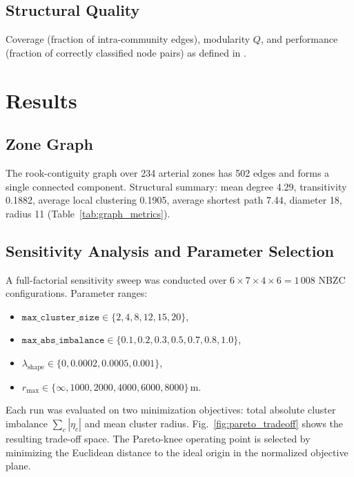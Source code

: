 \documentclass[conference]{IEEEtran}
\begin{document}
\subsection{Structural Quality}
Coverage (fraction of intra-community edges), modularity $Q$, and
performance (fraction of correctly classified node pairs) as defined in
\cite{nx_comm}.

\section{Results}

\subsection{Zone Graph}
The rook-contiguity graph over 234 arterial zones has 502 edges and
forms a single connected component.
Structural summary: mean degree 4.29, transitivity 0.1882, average
local clustering 0.1905, average shortest path 7.44, diameter 18,
radius 11 (Table~\ref{tab:graph_metrics}).

\subsection{Sensitivity Analysis and Parameter Selection}

A full-factorial sensitivity sweep was conducted over
$6\times7\times4\times6=1\,008$ NBZC configurations.
Parameter ranges:
\begin{itemize}
  \item $\texttt{max\_cluster\_size} \in \{2,4,8,12,15,20\}$,
  \item $\texttt{max\_abs\_imbalance} \in \{0.1,0.2,0.3,0.5,0.7,0.8,1.0\}$,
  \item $\lambda_{\mathrm{shape}} \in \{0,0.0002,0.0005,0.001\}$,
  \item $r_{\max} \in \{\infty,1000,2000,4000,6000,8000\}$\,m.
\end{itemize}
Each run was evaluated on two minimization objectives:
total absolute cluster imbalance $\sum_c|\eta_c|$ and
mean cluster radius.
Fig.~\ref{fig:pareto_tradeoff} shows the resulting trade-off space.
The Pareto-knee operating point is selected by minimizing the
Euclidean distance to the ideal origin in the normalized objective plane.
\end{document}
